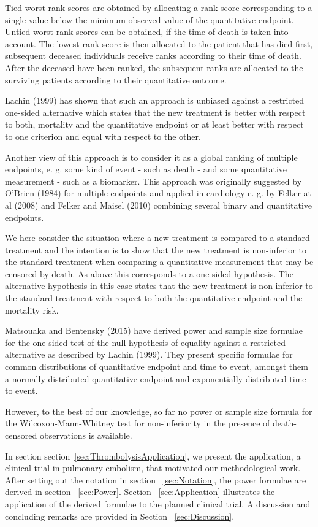 \documentclass[bimj,fleqn]{w-art}\usepackage[]{graphicx}\usepackage[]{color}
\theoremstyle{plain}
\theoremstyle{definition}
\begin{document}
Tied worst-rank scores are obtained by allocating a rank score corresponding
to a single value below the minimum observed value of the quantitative
endpoint. Untied worst-rank scores can be obtained, if the time of death is
taken into account. The lowest rank score is then allocated to the patient
that has died first, subsequent deceased individuals receive ranks according
to their time of death. After the deceased have been ranked, the subsequent
ranks are allocated to the surviving patients according to their quantitative
outcome.

Lachin (1999) has shown that such an approach is unbiased against a restricted
one-sided alternative which states that the new treatment is better with
respect to both, mortality and the quantitative endpoint or at least better
with respect to one criterion and equal with respect to the other.

Another view of this approach is to consider it as a global ranking of
multiple endpoints, e. g. some kind of event - such as death - and some
quantitative measurement - such as a biomarker. This approach was originally
suggested by O'Brien (1984) for multiple endpoints and applied in cardiology
e. g. by Felker at al (2008) and Felker and Maisel (2010) combining several
binary and quantitative endpoints.

We here consider the situation where a new treatment is compared to a standard
treatment and the intention is to show that the new treatment is non-inferior
to the standard treatment when comparing a quantitative measurement that may
be censored by death. As above this corresponds to a one-sided hypothesis.
The alternative hypothesis in this case states that the new treatment is
non-inferior to the standard treatment with respect to both the quantitative
endpoint and the mortality risk.

Matsouaka and Bentensky (2015) have derived power and sample size formulae for
the one-sided test of the null hypothesis of equality against a restricted
alternative as described by Lachin (1999). They present specific formulae for
common distributions of quantitative endpoint and time to event, amongst them
a normally distributed quantitative endpoint and exponentially distributed
time to event.

However, to the best of our knowledge, so far no power or sample size formula
for the Wilcoxon-Mann-Whitney test for non-inferiority in the presence of
death-censored observations is available.

In section section~\ref{sec:ThrombolysisApplication}, we present the
application, a clinical trial in pulmonary embolism, that motivated our
methodological work. After setting out the notation in section
~\ref{sec:Notation}, the power formulae are derived in section ~\ref{sec:Power}.
Section ~\ref{sec:Application} illustrates the application of the derived
formulae to the planned clinical trial. A discussion and concluding remarks
are provided in Section ~\ref{sec:Discussion}.
\end{document}

